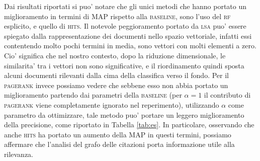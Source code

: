 Dai risultati riportati si puo' notare che gli unici metodi che hanno portato un miglioramento in termini di MAP rispetto alla \textsc{baseline}, sono l'uso del \textsc{rf} esplicito, e quello di \textsc{hits}. Il notevole peggioramento portato da \textsc{lsa} puo' essere spiegato dalla rappresentazione dei documenti nello spazio vettoriale, infatti essi contentendo molto pochi termini in media, sono vettori con molti elementi a zero. Cio' significa che nel nostro contesto, dopo la riduzione dimensionale, le similarita' tra i vettori non sono significative, e il riordinamento quindi sposta alcuni documenti rilevanti dalla cima della classifica verso il fondo. Per il \textsc{pagerank} invece possiamo vedere che sebbene esso non abbia portato un miglioramento partendo dai parametri della \textsc{baseline} (per $\alpha = 1$ il contributo di \textsc{pagerank} viene completamente ignorato nel reperimento), utilizzando $\alpha$ come parametro da ottimizzare, tale metodo puo' portare un leggero miglioramento della precisione, come riportato in Tabella \ref{tab:es}. In particolare, osservando che anche \textsc{hits} ha portato un aumento della MAP in questi termini, possiamo affermare che l'analisi del grafo delle citazioni porta informazione utile alla rilevanza.

